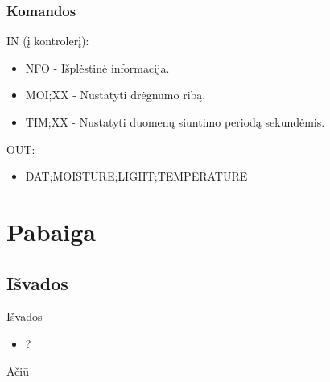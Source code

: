 \documentclass[12pt,a4paper]{beamer}
\begin{document}
\begin{frame}
    \frametitle{Komandos}

    
    IN (į kontrolerį):
    \begin{itemize}
        \item NFO - Išplėstinė informacija.
        \item MOI;XX - Nustatyti drėgnumo ribą.
        \item TIM;XX - Nustatyti duomenų siuntimo periodą sekundėmis.
    \end{itemize}

    OUT:
    \begin{itemize}
        \item DAT;MOISTURE;LIGHT;TEMPERATURE
    \end{itemize}

\end{frame}

\section{Pabaiga}

\subsection{Išvados}
\begin{frame}{Išvados}
    \begin{itemize}
        \item ?
    \end{itemize}
\end{frame}

\begin{frame}
	\begin{center}
        {\Huge Ačiū}
	\end{center}
\end{frame}
\end{document}
